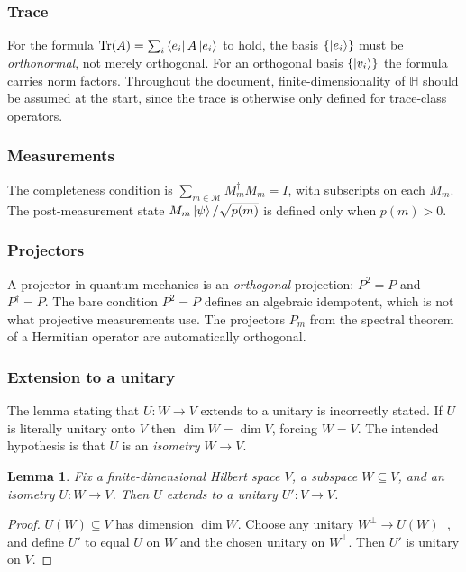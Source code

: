 \documentclass[12pt]{article}
\theoremstyle{plain}
\newtheorem{lemma}[thm]{Lemma}
\theoremstyle{definition}
\begin{document}
\subsubsection*{Trace}

For the formula $\operatorname{Tr}(A)=\sum_i\bra{e_i}A\ket{e_i}$ to hold, the basis $\{\ket{e_i}\}$ must be \emph{orthonormal}, not merely orthogonal. For an orthogonal basis $\{\ket{v_i}\}$ the formula carries norm factors. Throughout the document, finite-dimensionality of $\mathbb{H}$ should be assumed at the start, since the trace is otherwise only defined for trace-class operators.

\subsubsection*{Measurements}

The completeness condition is $\sum_{m\in\mathcal{M}}M_m^\dagger M_m=I$, with subscripts on each $M_m$. The post-measurement state $M_m\ket{\psi}/\sqrt{p(m)}$ is defined only when $p(m)>0$.

\subsubsection*{Projectors}

A projector in quantum mechanics is an \emph{orthogonal} projection: $P^2=P$ and $P^\dagger=P$. The bare condition $P^2=P$ defines an algebraic idempotent, which is not what projective measurements use. The projectors $P_m$ from the spectral theorem of a Hermitian operator are automatically orthogonal.

\subsubsection*{Extension to a unitary}

The lemma stating that $U:W\to V$ extends to a unitary is incorrectly stated. If $U$ is literally unitary onto $V$ then $\dim W=\dim V$, forcing $W=V$. The intended hypothesis is that $U$ is an \emph{isometry} $W\to V$.

\begin{lemma}
Fix a finite-dimensional Hilbert space $V$, a subspace $W\subseteq V$, and an isometry $U:W\to V$. Then $U$ extends to a unitary $U':V\to V$.
\end{lemma}
\begin{proof}
$U(W)\subseteq V$ has dimension $\dim W$. Choose any unitary $W^\perp\to U(W)^\perp$, and define $U'$ to equal $U$ on $W$ and the chosen unitary on $W^\perp$. Then $U'$ is unitary on $V$.
\end{proof}
\end{document}

